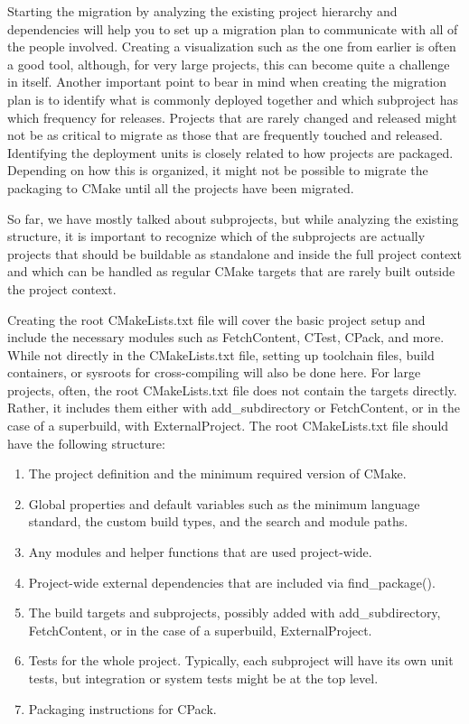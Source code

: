 Starting the migration by analyzing the existing project hierarchy and dependencies
will help you to set up a migration plan to communicate with all of the people involved.
Creating a visualization such as the one from earlier is often a good tool, although, for
very large projects, this can become quite a challenge in itself. Another important point to
bear in mind when creating the migration plan is to identify what is commonly deployed
together and which subproject has which frequency for releases. Projects that are rarely
changed and released might not be as critical to migrate as those that are frequently
touched and released. Identifying the deployment units is closely related to how projects
are packaged. Depending on how this is organized, it might not be possible to migrate the
packaging to CMake until all the projects have been migrated.

So far, we have mostly talked about subprojects, but while analyzing the existing structure,
it is important to recognize which of the subprojects are actually projects that should be
buildable as standalone and inside the full project context and which can be handled as
regular CMake targets that are rarely built outside the project context.

Creating the root CMakeLists.txt file will cover the basic project setup and include
the necessary modules such as FetchContent, CTest, CPack, and more. While not
directly in the CMakeLists.txt file, setting up toolchain files, build containers, or
sysroots for cross-compiling will also be done here. For large projects, often, the root
CMakeLists.txt file does not contain the targets directly. Rather, it includes them
either with add\_subdirectory or FetchContent, or in the case of a superbuild,
with ExternalProject. The root CMakeLists.txt file should have the
following structure:

\begin{enumerate}
\item 
The project definition and the minimum required version of CMake.

\item
Global properties and default variables such as the minimum language standard, the custom build types, and the search and module paths.

\item
Any modules and helper functions that are used project-wide.

\item
Project-wide external dependencies that are included via find\_package().

\item
The build targets and subprojects, possibly added with add\_subdirectory, FetchContent, or in the case of a superbuild, ExternalProject.

\item
Tests for the whole project. Typically, each subproject will have its own unit tests, but integration or system tests might be at the top level.

\item
Packaging instructions for CPack.
\end{enumerate}

